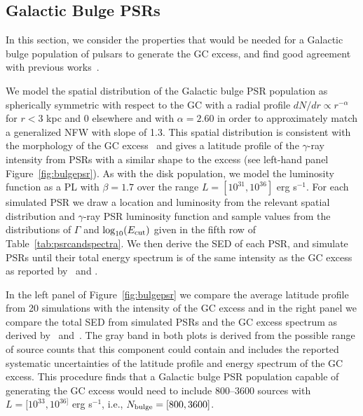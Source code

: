 \documentclass[iop]{emulateapj}
\begin{document}


\subsection{Galactic Bulge PSRs}
\label{sec:bulge_dist}

In this section, we consider the properties that would be needed for a 
Galactic bulge population of pulsars to generate the GC excess, and find
good agreement with previous works~\citep{2012PhRvD..86h3511A,
  2015ApJ...812...15B, Bartels:2015aea, Hooper:2015jlu}.

We model the spatial distribution of the Galactic bulge PSR
population as spherically symmetric with respect to the GC with a
radial profile $dN/dr \propto r^{-\alpha}$ for $r<3$ kpc and 0
elsewhere and with $\alpha=2.60$ in order to approximately match a
generalized NFW with slope of 1.3.  This spatial distribution is
consistent with the morphology of the GC
excess~\citep{Calore:2014xka,2016PDU....12....1D,2016ApJ...819...44A,
  TheFermi-LAT:2017vmf} and gives a latitude profile of the
$\gamma$-ray intensity from PSRs with a similar shape to the excess
(see left-hand panel Figure~\ref{fig:bulgepsr}).  As with the disk
population, we model the luminosity function as a PL with $\beta=1.7$
over the range $L=[10^{31},10^{36}]$ erg s$^{-1}$.  For each simulated
PSR we draw a location and luminosity from the relevant spatial
distribution and $\gamma$-ray PSR luminosity function and sample
values from the distributions of $\Gamma$ and
$\log_{10}(E_{\rm{cut}})$ given in the fifth row of
Table~\ref{tab:psrcandspectra}.  We then derive the SED of each PSR,
and simulate PSRs until their total energy spectrum is of the same
intensity as the GC excess as reported by~\citet{Calore:2014xka} and
\citet{TheFermi-LAT:2017vmf}.

In the left panel of Figure~\ref{fig:bulgepsr} we compare the average
latitude profile from 20 simulations with the intensity of the GC
excess and in the right panel we compare the total SED from simulated
PSRs and the GC excess spectrum as derived by~\citet{Calore:2014xka}
and~\citet{TheFermi-LAT:2017vmf}. The gray band in both plots is
derived from the possible range of source counts that this component
could contain and includes the reported systematic uncertainties of the latitude profile and energy spectrum
of the GC excess. This procedure finds that a Galactic bulge PSR
population capable of generating the GC excess would need to include
800--3600 sources with $L = [10^{33},10^{36]}$
erg s$^{-1}$, i.e., $N_{\rm bulge} = [800,3600]$.
\end{document}
